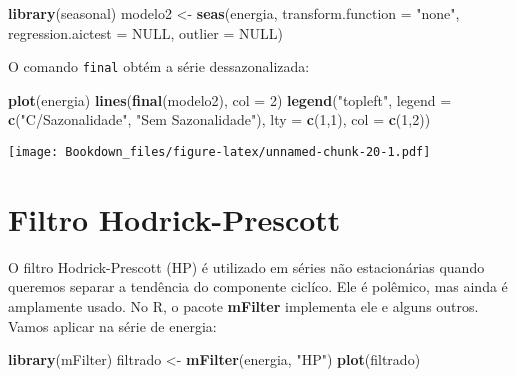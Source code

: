 \documentclass[]{book}
\newenvironment{Shaded}{\begin{snugshade}}{\end{snugshade}}
\newcommand{\KeywordTok}[1]{\textcolor[rgb]{0.13,0.29,0.53}{\textbf{#1}}}
\newcommand{\DataTypeTok}[1]{\textcolor[rgb]{0.13,0.29,0.53}{#1}}
\newcommand{\DecValTok}[1]{\textcolor[rgb]{0.00,0.00,0.81}{#1}}
\newcommand{\StringTok}[1]{\textcolor[rgb]{0.31,0.60,0.02}{#1}}
\newcommand{\OtherTok}[1]{\textcolor[rgb]{0.56,0.35,0.01}{#1}}
\newcommand{\NormalTok}[1]{#1}
\begin{document}
\begin{Shaded}
\begin{Highlighting}[]
\KeywordTok{library}\NormalTok{(seasonal)}
\NormalTok{modelo2 <-}\StringTok{ }\KeywordTok{seas}\NormalTok{(energia, }\DataTypeTok{transform.function =} \StringTok{"none"}\NormalTok{, }\DataTypeTok{regression.aictest =} \OtherTok{NULL}\NormalTok{, }\DataTypeTok{outlier =} \OtherTok{NULL}\NormalTok{)}
\end{Highlighting}
\end{Shaded}

O comando \texttt{final} obtém a série dessazonalizada:

\begin{Shaded}
\begin{Highlighting}[]
\KeywordTok{plot}\NormalTok{(energia)}
\KeywordTok{lines}\NormalTok{(}\KeywordTok{final}\NormalTok{(modelo2), }\DataTypeTok{col =} \DecValTok{2}\NormalTok{)}
\KeywordTok{legend}\NormalTok{(}\StringTok{"topleft"}\NormalTok{, }\DataTypeTok{legend =} \KeywordTok{c}\NormalTok{(}\StringTok{"C/Sazonalidade"}\NormalTok{, }\StringTok{"Sem Sazonalidade"}\NormalTok{), }\DataTypeTok{lty =} \KeywordTok{c}\NormalTok{(}\DecValTok{1}\NormalTok{,}\DecValTok{1}\NormalTok{), }\DataTypeTok{col =} \KeywordTok{c}\NormalTok{(}\DecValTok{1}\NormalTok{,}\DecValTok{2}\NormalTok{))}
\end{Highlighting}
\end{Shaded}

\texttt{[image: Bookdown\_files/figure-latex/unnamed-chunk-20-1.pdf]}

\section{Filtro Hodrick-Prescott}\label{filtro-hodrick-prescott}

O filtro Hodrick-Prescott (HP) é utilizado em séries não estacionárias
quando queremos separar a tendência do componente ciclíco. Ele é
polêmico, mas ainda é amplamente usado. No R, o pacote \textbf{mFilter}
implementa ele e alguns outros. Vamos aplicar na série de energia:

\begin{Shaded}
\begin{Highlighting}[]
\KeywordTok{library}\NormalTok{(mFilter)}
\NormalTok{filtrado <-}\StringTok{ }\KeywordTok{mFilter}\NormalTok{(energia, }\StringTok{"HP"}\NormalTok{)}
\KeywordTok{plot}\NormalTok{(filtrado)}
\end{Highlighting}
\end{Shaded}
\end{document}
